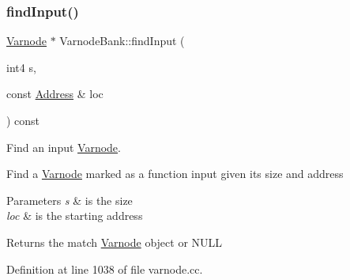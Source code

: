 \subsubsection{\texorpdfstring{findInput()}{findInput()}}
{\footnotesize\ttfamily \mbox{\hyperlink{class_varnode}{Varnode}} $\ast$ Varnode\+Bank\+::find\+Input (\begin{DoxyParamCaption}\item[{int4}]{s,  }\item[{const \mbox{\hyperlink{class_address}{Address}} \&}]{loc }\end{DoxyParamCaption}) const}



Find an input \mbox{\hyperlink{class_varnode}{Varnode}}. 

Find a \mbox{\hyperlink{class_varnode}{Varnode}} marked as a function input given its size and address 
\begin{DoxyParams}{Parameters}
{\em s} & is the size \\
\hline
{\em loc} & is the starting address \\
\hline
\end{DoxyParams}
\begin{DoxyReturn}{Returns}
the match \mbox{\hyperlink{class_varnode}{Varnode}} object or N\+U\+LL 
\end{DoxyReturn}


Definition at line 1038 of file varnode.\+cc.

